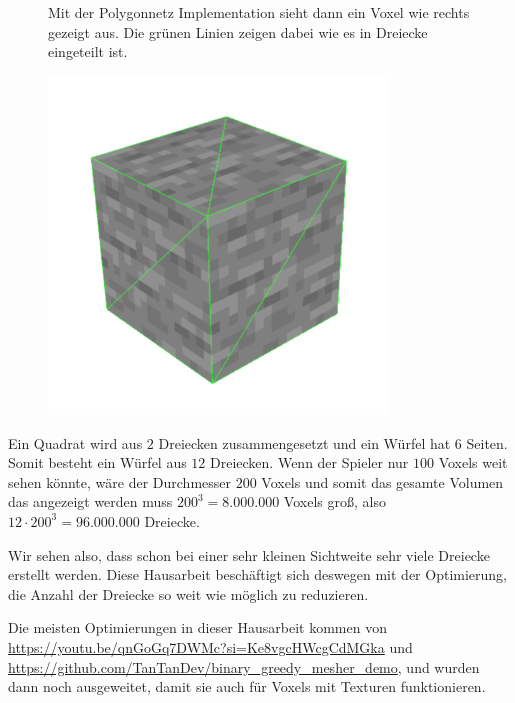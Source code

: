 \begin{figure}[ht]
	\begin{minipage}[c]{0.48\textwidth}
Mit der Polygonnetz Implementation sieht dann ein
Voxel wie rechts gezeigt aus.
Die grünen Linien zeigen dabei wie es in Dreiecke
eingeteilt ist.
	\end{minipage}
	\begin{minipage}[c]{0.5\textwidth}
		\begin{center}
\includegraphics[width=0.8\textwidth]{../assets/single_voxel.png}
		\end{center}
	\end{minipage}\hfill
\end{figure}

\goodbreak

Ein Quadrat wird aus $2$ Dreiecken zusammengesetzt
und ein Würfel hat $6$ Seiten. Somit besteht ein Würfel
aus $12$ Dreiecken. Wenn der Spieler nur $100$ Voxels
weit sehen könnte, wäre der Durchmesser $200$ Voxels
und somit das gesamte Volumen das angezeigt werden
muss $200^3 = 8.000.000$ Voxels groß, also
$12 \cdot 200^3 = 96.000.000$ Dreiecke.

Wir sehen also, dass schon bei einer sehr kleinen
Sichtweite sehr viele Dreiecke erstellt werden.
Diese Hausarbeit beschäftigt sich deswegen mit der
Optimierung, die Anzahl der Dreiecke so weit wie
möglich zu reduzieren.

Die meisten Optimierungen in dieser Hausarbeit
kommen von \url{https://youtu.be/qnGoGq7DWMc?si=Ke8vgcHWcgCdMGka}
und \url{https://github.com/TanTanDev/binary_greedy_mesher_demo},
und wurden dann noch ausgeweitet, damit sie auch für
Voxels mit Texturen funktionieren.
